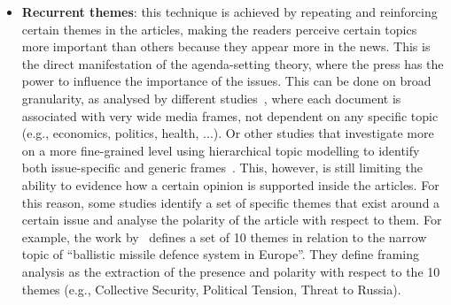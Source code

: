 \begin{itemize}
    \item \textbf{Recurrent themes}: this technique is achieved by repeating and reinforcing certain themes in the articles, making the readers perceive certain topics more important than others because they appear more in the news. This is the direct manifestation of the agenda-setting theory, where the press has the power to influence the importance of the issues.
    This can be done on broad granularity, as analysed by different studies~\cite{tsur2015frame,card2015media}, where each document is associated with very wide media frames, not dependent on any specific topic (e.g., economics, politics, health, ...).
    Or other studies that investigate more on a more fine-grained level using hierarchical topic modelling to identify both issue-specific and generic frames~\cite{boydstun2013making}.
    This, however, is still limiting the ability to evidence how a certain opinion is supported inside the articles. For this reason, some studies identify a set of specific themes that exist around a certain issue and analyse the polarity of the article with respect to them. For example, the work by~\citet{morstatter2018identifying} defines a set of 10 themes in relation to the narrow topic of ``ballistic missile defence system in Europe''. %
    They define framing analysis as the extraction of the presence and polarity with respect to the 10 themes (e.g., Collective Security, Political Tension, Threat to Russia).
    
    

\end{itemize}
